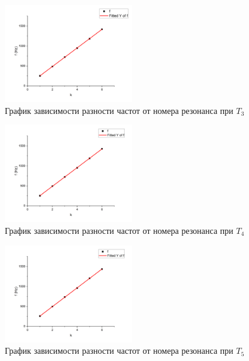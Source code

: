\documentclass[a4paper, 12pt]{article}%
\begin{document}
\begin{figure}
\begin{center}
\includegraphics[width = 0.5\textwidth]{labphoto19.png}
\caption{График зависимости разности частот от номера резонанса при $T_3$}
\end{center}
\end{figure}

\begin{figure}
\begin{center}
\includegraphics[width = 0.5\textwidth]{labphoto20.png}
\caption{График зависимости разности частот от номера резонанса при $T_4$}
\end{center}
\end{figure}

\begin{figure}
\begin{center}
\includegraphics[width = 0.5\textwidth]{labphoto21.png}
\caption{График зависимости разности частот от номера резонанса при $T_5$}
\end{center}
\end{figure}
\end{document}

